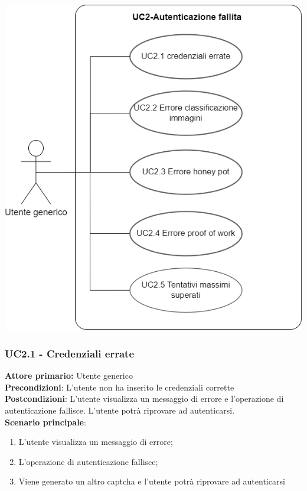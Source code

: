 \begin{center}
	\includegraphics[scale = 0.9]{img/Autenticazione_fallita.png}\\
\end{center}

\subsubsection{UC2.1 - Credenziali errate}
\textbf{Attore primario:} Utente generico\\
\textbf{Precondizioni}: L’utente non ha inserito le credenziali corrette\\
\textbf{Postcondizioni}:  L’utente visualizza un messaggio di errore e l’operazione di autenticazione fallisce. L’utente potrà riprovare  ad autenticarsi.\\

\textbf{Scenario principale}:
\begin{enumerate}
	\item L’utente visualizza un messaggio di errore;
	\item L’operazione di autenticazione fallisce;
	\item Viene generato un altro captcha e l’utente potrà riprovare ad autenticarsi
\end{enumerate}

